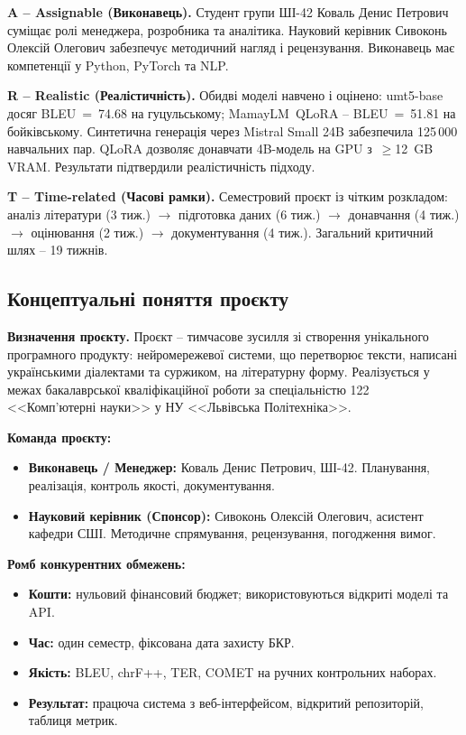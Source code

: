 \documentclass[14pt]{extarticle}
\begin{document}
\textbf{A -- Assignable (Виконавець).} Студент групи ШІ-42 Коваль Денис Петрович суміщає ролі менеджера, розробника та аналітика. Науковий керівник Сивоконь Олексій Олегович забезпечує методичний нагляд і рецензування. Виконавець має компетенції у Python, PyTorch та NLP.

\textbf{R -- Realistic (Реалістичність).} Обидві моделі навчено і оцінено: umt5-base досяг BLEU~=~74.68 на гуцульському; MamayLM~QLoRA -- BLEU~=~51.81 на бойківському. Синтетична генерація через Mistral Small 24B забезпечила 125\,000 навчальних пар. QLoRA дозволяє донавчати 4B-модель на GPU з~$\geq$12~GB VRAM. Результати підтвердили реалістичність підходу.

\textbf{T -- Time-related (Часові рамки).} Семестровий проєкт із чітким розкладом: аналіз літератури (3 тиж.) $\to$ підготовка даних (6 тиж.) $\to$ донавчання (4 тиж.) $\to$ оцінювання (2 тиж.) $\to$ документування (4 тиж.). Загальний критичний шлях -- 19 тижнів.

\subsection{Концептуальні поняття проєкту}

\textbf{Визначення проєкту.} Проєкт -- тимчасове зусилля зі створення унікального програмного продукту: нейромережевої системи, що перетворює тексти, написані українськими діалектами та суржиком, на літературну форму. Реалізується у межах бакалаврської кваліфікаційної роботи за спеціальністю 122 <<Комп'ютерні науки>> у НУ <<Львівська Політехніка>>.

\textbf{Команда проєкту:}
\begin{itemize}
  \item \textbf{Виконавець / Менеджер:} Коваль Денис Петрович, ШІ-42. Планування, реалізація, контроль якості, документування.
  \item \textbf{Науковий керівник (Спонсор):} Сивоконь Олексій Олегович, асистент кафедри СШІ. Методичне спрямування, рецензування, погодження вимог.
\end{itemize}

\textbf{Ромб конкурентних обмежень:}
\begin{itemize}
  \item \textbf{Кошти:} нульовий фінансовий бюджет; використовуються відкриті моделі та API.
  \item \textbf{Час:} один семестр, фіксована дата захисту БКР.
  \item \textbf{Якість:} BLEU, chrF++, TER, COMET на ручних контрольних наборах.
  \item \textbf{Результат:} працюча система з веб-інтерфейсом, відкритий репозиторій, таблиця метрик.
\end{itemize}
\end{document}
